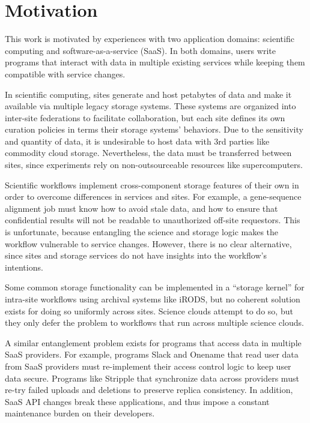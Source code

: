 \section{Motivation}
\label{sec:motivation}

This work is motivated by experiences with two application domains:
scientific computing and software-as-a-service (SaaS). In both domains, users
write programs that interact with data in multiple existing services while
keeping them compatible with service changes.

In scientific computing, sites generate and host petabytes of data and make it
available via multiple legacy storage systems.  These systems are organized
into inter-site federations to facilitate collaboration, but each site defines
its own curation policies in terms their storage systems' behaviors. Due
to the sensitivity and quantity of data, it is undesirable to host data with 3rd
parties like commodity cloud storage. Nevertheless, the data must be transferred
between sites, since experiments rely on non-outsourceable resources like
supercomputers.

Scientific workflows implement cross-component storage features of their own in
order to overcome differences in services and sites.  For example, a
gene-sequence alignment job must know how to avoid stale data, and how to ensure
that confidential results will not be readable to unauthorized off-site
requestors. This is unfortunate, because entangling the science and storage
logic makes the workflow vulnerable to service changes.  However, there is no
clear alternative, since sites and storage services do not have insights into
the workflow's intentions.

Some common storage functionality can be implemented in a ``storage
kernel'' for intra-site workflows using archival systems like iRODS, but no
coherent solution exists for doing so uniformly across sites. Science clouds
attempt to do so, but they only defer the problem to workflows that run across
multiple science clouds.

A similar entanglement problem exists for programs that access data in multiple
SaaS providers.  For example, programs Slack and Onename that read user data
from SaaS providers must re-implement their access control logic to keep user
data secure.  Programs like Stripple that synchronize data across providers
must re-try failed uploads and deletions to preserve replica consistency. In
addition, SaaS API changes break these applications, and thus impose a constant
maintenance burden on their developers.


